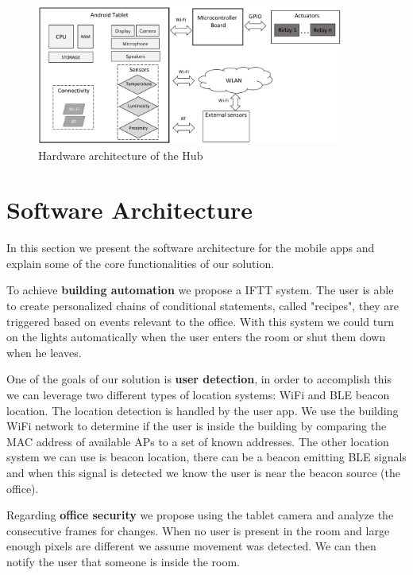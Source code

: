 \begin{figure}[h]
\centering
\includegraphics[width=0.9\textwidth]{Figures/arch_hardware}
\caption{Hardware architecture of the Hub}
\label{architecture_system}
\end{figure}


\section{Software Architecture}\label{architecture4} 

In this section we present the software architecture for the mobile apps and explain some of the core functionalities of our solution.

To achieve \textbf{building automation} we propose a \ac{IFTT} system. The user is able to create personalized chains of conditional statements, called "recipes", they are triggered based on events relevant to the office. With this system we could turn on the lights automatically when the user enters the room or shut them down when he leaves.

One of the goals of our solution is \textbf{user detection}, in order to accomplish this we can leverage two different types of location systems: \ac{WiFi} and \ac{BLE} beacon location. The location detection is handled by the user app. We use the building \ac{WiFi} network to determine if the user is inside the building by comparing the \ac{MAC address} of available \ac{AP}s to a set of known addresses. The other location system we can use is beacon location, there can be a beacon emitting \ac{BLE} signals and when this signal is detected we know the user is near the beacon source (the office).

Regarding \textbf{office security} we propose using the tablet camera and analyze the consecutive frames for changes. When no user is present in the room and large enough pixels are different we assume movement was detected. We can then notify the user that someone is inside the room.


